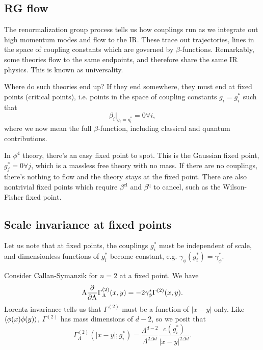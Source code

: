 \subsection*{RG flow}
The renormalization group process tells us how couplings run as we integrate out high momentum modes and flow to the IR. These trace out trajectories, lines in the space of coupling constants which are governed by $\beta$-functions. Remarkably, some theories flow to the same endpoints, and therefore share the same IR physics. This is known as universality.

Where do such theories end up? If they end somewhere, they must end at fixed points (critical points), i.e. points in the space of coupling constants $g_i=g_i^*$ such that
\begin{equation}
    \beta_i|_{g_i=g_i^*}=0 \forall i,
\end{equation}
where we now mean the full $\beta$-function, including classical and quantum contributions.

In $\phi^4$ theory, there's an easy fixed point to spot. This is the Gaussian fixed point, $g_j^*=0 \forall j$, which is a massless free theory with no mass. If there are no couplings, there's nothing to flow and the theory stays at the fixed point. There are also nontrivial fixed points which require $\beta^\text{cl}$ and $\beta^\text{q}$ to cancel, such as the Wilson-Fisher fixed point.

\subsection*{Scale invariance at fixed points} Let us note that at fixed points, the couplings $g_i^*$ must be independent of scale, and dimensionless functions of $g_i^*$ become constant, e.g. $\gamma_\phi(g_i^*)=\gamma_\phi^*$.

Consider Callan-Symanzik for $n=2$ at a fixed point. We have
\begin{equation}
    \Lambda \P{}{\Lambda} \Gamma_\Lambda^{(2)}(x,y) = -2 \gamma_\phi^* \Gamma^{(2)} (x,y).
\end{equation}
Lorentz invariance tells us that $\Gamma^{(2)}$ must be a function of $|x-y|$ only. Like $\avg{\phi(x)\phi(y)}$, $\Gamma^{(2)}$ has mass dimensions of $d-2$, so we posit that
\begin{equation}
    \Gamma_\Lambda^{(2)}(|x-y|; g_i^*) =\frac{\Lambda^{d-2}}{\Lambda^{2\Delta d}} \frac{c(g_i^*)}{|x-y|^{2\Delta d}}.
\end{equation}
